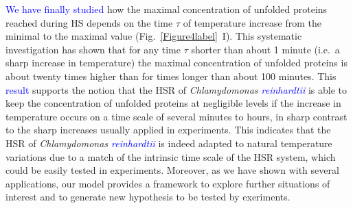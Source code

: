 \documentclass[oneside, 10pt, a4paper, twocolumn]{article}
\begin{document}

\textcolor{blue}{We have finally studied} how the maximal concentration of unfolded proteins reached during HS depends on the time $\tau$ of temperature increase from the minimal to the maximal value (Fig.~\ref{Figure4label}~I). This systematic investigation has shown that  for any time $\tau$ shorter than about 1 minute (i.e.~a sharp increase in temperature) the maximal concentration of unfolded proteins is about twenty times higher than for  times longer than about 100 minutes.
This \textcolor{blue}{result} supports the notion that the HSR of \emph{Chlamydomonas \textcolor{blue}{reinhardtii}} is able to keep the concentration of unfolded proteins at
negligible levels if the increase in temperature occurs on a time scale of several minutes to hours, in sharp contrast to the sharp increases usually applied in experiments. %
This indicates that the HSR of \emph{Chlamydomonas \textcolor{blue}{reinhardtii}} is indeed adapted to natural temperature variations due to a match of the intrinsic time scale of the HSR system, which could be easily tested in experiments. 
Moreover, as we have shown with several applications, our model provides a framework to explore further situations of interest and to generate new hypothesis to be tested by exeriments.
\end{document}
